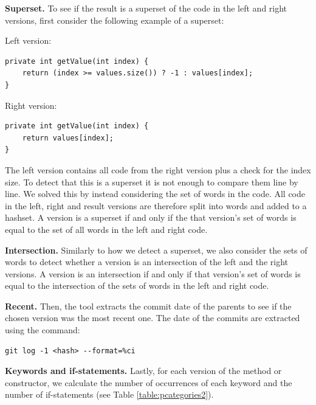 \textbf{Superset.} To see if the result is a superset of the code in the left and right versions, first consider the following example of a superset:

Left version:
\lstset{language=Java,numbers=left,xleftmargin=2em,frame=single,framexleftmargin=1.5em}
\begin{lstlisting}[frame=single,breaklines=true,tabsize=2]
private int getValue(int index) {
	return (index >= values.size()) ? -1 : values[index];
}
\end{lstlisting}

Right version:
\lstset{language=Java,numbers=left,xleftmargin=2em,frame=single,framexleftmargin=1.5em}
\begin{lstlisting}[frame=single,breaklines=true,tabsize=2]
private int getValue(int index) {
	return values[index];
}
\end{lstlisting}
The left version contains all code from the right version plus a check for the index size. To detect that this is a superset it is not enough to compare them line by line. We solved this by instead considering the set of words in the code. All code in the left, right and result versions are therefore split into words and added to a hashset. A version is a superset if and only if the  that version’s set of words is equal to the set of all words in the left and right code.

\textbf{Intersection.} Similarly to how we detect a superset, we also consider the sets of words to detect whether a version is an intersection of the left and the right versions. A version is an intersection if and only if that version’s set of words is equal to the intersection of the sets of words in the left and right code.

\textbf{Recent.} Then, the tool extracts the commit date of the parents to see if the chosen version was the most recent one. The date of the commits are extracted using the command:
\lstset{language=Bash,numbers=left,xleftmargin=2em,frame=single,framexleftmargin=1.5em}
\begin{lstlisting}[frame=single,breaklines=true,tabsize=2]
git log -1 <hash> --format=%ci
\end{lstlisting}

\textbf{Keywords and if-statements.} Lastly, for each version of the method or constructor, we calculate the number of occurrences of each keyword and the number of if-statements (see Table \ref{table:pcategories2}).

